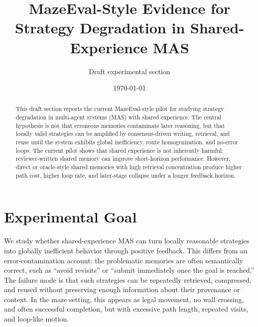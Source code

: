 \documentclass[11pt]{article}
\title{MazeEval-Style Evidence for Strategy Degradation in Shared-Experience MAS}
\author{Draft experimental section}
\date{\today}
\begin{document}
\maketitle

\begin{center}
\end{center}

\begin{abstract}
This draft section reports the current MazeEval-style pilot for studying strategy degradation in multi-agent systems (MAS) with shared experience. The central hypothesis is not that erroneous memories contaminate later reasoning, but that locally valid strategies can be amplified by consensus-driven writing, retrieval, and reuse until the system exhibits global inefficiency, route homogenization, and no-error loops. The current pilot shows that shared experience is not inherently harmful: reviewer-written shared memory can improve short-horizon performance. However, direct or oracle-style shared memories with high retrieval concentration produce higher path cost, higher loop rate, and later-stage collapse under a longer feedback horizon.
\end{abstract}

\section{Experimental Goal}

We study whether shared-experience MAS can turn locally reasonable strategies into globally inefficient behavior through positive feedback. This differs from an error-contamination account: the problematic memories are often semantically correct, such as ``avoid revisits'' or ``submit immediately once the goal is reached.'' The failure mode is that such strategies can be repeatedly retrieved, compressed, and reused without preserving enough information about their provenance or context. In the maze setting, this appears as legal movement, no wall crossing, and often successful completion, but with excessive path length, repeated visits, and loop-like motion.
\end{document}
